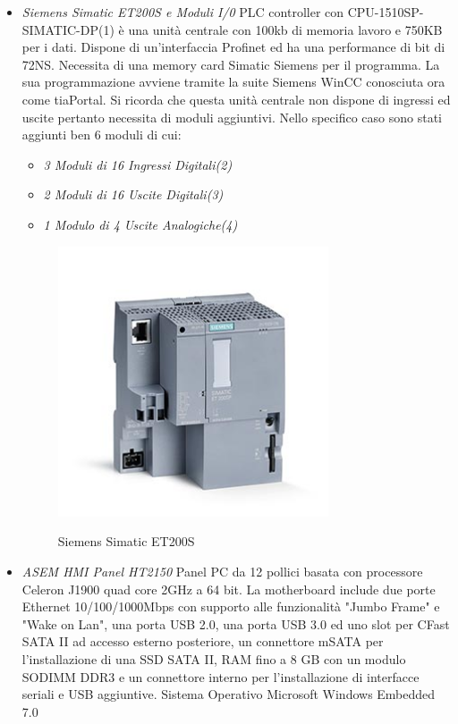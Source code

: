 \documentclass[12pt, a4paper, oneside]{book}
\begin{document}
\begin{itemize}
	\item \textit{Siemens Simatic ET200S e Moduli I/0}	
	PLC controller con CPU-1510SP-SIMATIC-DP(1) è una unità centrale con 100kb di memoria lavoro e 750KB per i dati. Dispone di un'interfaccia Profinet ed ha una performance di bit di 72NS. Necessita di una memory card Simatic Siemens per il programma.
	La sua programmazione avviene tramite la suite Siemens WinCC conosciuta ora come tiaPortal. 
	Si ricorda che questa unità centrale non dispone di ingressi ed uscite pertanto necessita di moduli aggiuntivi. Nello specifico caso sono stati aggiunti ben 6 moduli di cui:
	\begin{itemize}
		\item \textit{3 Moduli di 16 Ingressi Digitali(2)}
		\item \textit{2 Moduli di 16 Uscite Digitali(3)}
		\item \textit{1 Modulo di 4 Uscite Analogiche(4)}
	\end{itemize}

	\begin{figure}[H]
	\centering
	\includegraphics[width=8cm]{Immagini/ELE11}
	\label{ele11}
	\caption{Siemens Simatic ET200S}
	\end{figure}

	\item \textit{ASEM HMI Panel HT2150}
	Panel PC da 12 pollici basata con processore Celeron J1900 quad core 2GHz a 64 bit.	La motherboard include due porte Ethernet 10/100/1000Mbps con supporto alle funzionalità "Jumbo Frame" e "Wake on Lan", una porta USB 2.0, una porta USB 3.0 ed uno slot per CFast SATA II ad accesso esterno posteriore, un connettore mSATA per l’installazione di una SSD SATA II, RAM fino a 8 GB con un modulo SODIMM DDR3 e un connettore interno per l’installazione di interfacce seriali e USB aggiuntive.
	Sistema Operativo Microsoft Windows Embedded 7.0
	

\end{itemize}
\end{document}
